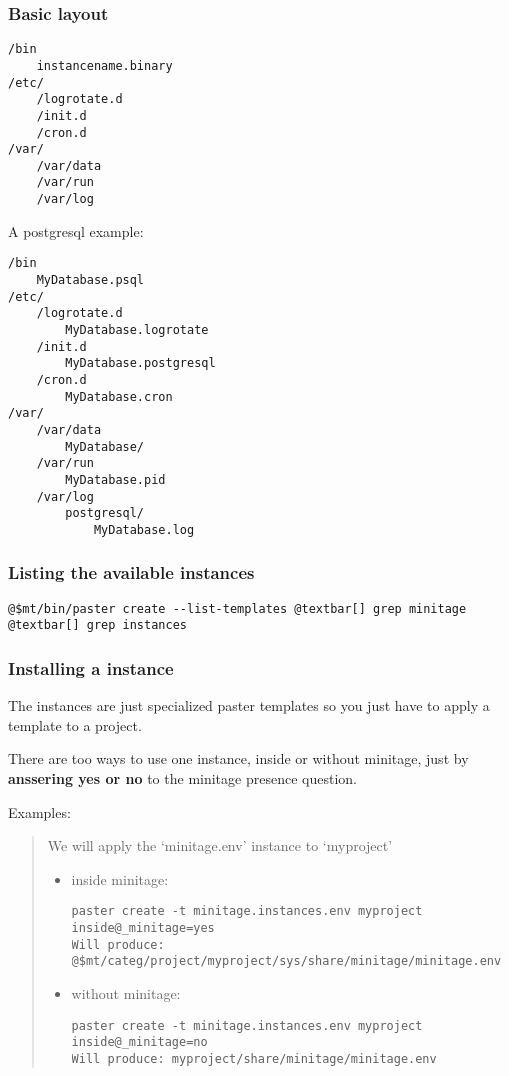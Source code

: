 \documentclass[letterpaper,10pt,english]{sphinxmanual}
\begin{document}
\subsubsection{Basic layout}
\label{paster/instances/index:basic-layout}
\begin{Verbatim}[commandchars=@\[\]]
/bin
    instancename.binary
/etc/
    /logrotate.d
    /init.d
    /cron.d
/var/
    /var/data
    /var/run
    /var/log
\end{Verbatim}

A postgresql example:

\begin{Verbatim}[commandchars=@\[\]]
/bin
    MyDatabase.psql
/etc/
    /logrotate.d
        MyDatabase.logrotate
    /init.d
        MyDatabase.postgresql
    /cron.d
        MyDatabase.cron
/var/
    /var/data
        MyDatabase/
    /var/run
        MyDatabase.pid
    /var/log
        postgresql/
            MyDatabase.log
\end{Verbatim}


\subsubsection{Listing the available instances}
\label{paster/instances/index:listing-the-available-instances}
\begin{Verbatim}[commandchars=@\[\]]
@$mt/bin/paster create --list-templates @textbar[] grep minitage @textbar[] grep instances
\end{Verbatim}


\subsubsection{Installing a instance}
\label{paster/instances/index:installing-a-instance}
The instances are just specialized paster templates so you just have to apply a template to a project.

There are too ways to use one instance, inside or without minitage, just by \textbf{anssering yes or no} to the minitage presence question.

Examples:
\begin{quote}

We will apply the `minitage.env' instance to `myproject'
\begin{itemize}
\item {} 
inside minitage:

\begin{Verbatim}[commandchars=@\[\]]
paster create -t minitage.instances.env myproject inside@_minitage=yes
Will produce: @$mt/categ/project/myproject/sys/share/minitage/minitage.env
\end{Verbatim}

\item {} 
without minitage:

\begin{Verbatim}[commandchars=@\[\]]
paster create -t minitage.instances.env myproject inside@_minitage=no
Will produce: myproject/share/minitage/minitage.env
\end{Verbatim}

\end{itemize}
\end{quote}
\end{document}
